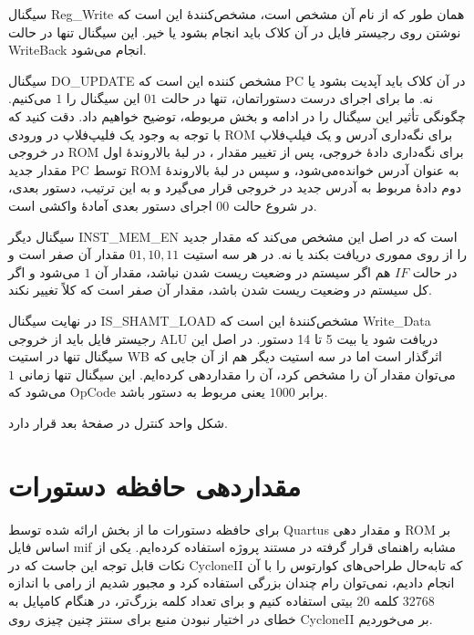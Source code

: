 \documentclass[12pt,titlepage,a4page , tikz , multi,table , svgnames,xcdraw]{article}
\begin{document}
\newpage

سیگنال Reg\_Write همان طور که از نام آن مشخص است، مشخص‌کنندهٔ این است که نوشتن روی رجیستر فایل در آن کلاک باید انجام بشود یا خیر. این سیگنال تنها در حالت WriteBack انجام می‌شود.

سیگنال DO\_UPDATE مشخص کننده این است که PC در آن کلاک باید آپدیت بشود یا نه. ما برای اجرای درست دستوراتمان، تنها در حالت $01$ این سیگنال را $1$ می‌کنیم. چگونگی تأثیر این سیگنال را در ادامه و بخش مربوطه، توضیح خواهیم داد. دقت کنید که با توجه به وجود یک فلیپ‌فلاپ در ورودی ROM برای نگه‌داری آدرس و یک فیلپ‌فلاپ در خروجی ROM برای نگه‌داری دادهٔ خروجی، پس از تغییر مقدار ، در لبهٔ بالاروندهٔ اول مقدار جدید PC توسط ROM به عنوان آدرس خوانده‌می‌شود، و سپس در لبهٔ بالاروندهٔ دوم دادهٔ مربوط به آدرس جدید در خروجی قرار می‌گیرد و به این ترتیب، دستور بعدی، در شروع حالت $00$ اجرای دستور بعدی آمادهٔ واکشی است.

سیگنال دیگر INST\_MEM\_EN است که در اصل این مشخص می‌کند که  مقدار جدید را از روی مموری دریافت بکند یا نه. در هر سه استیت $01,10,11$ مقدار آن صفر است و در حالت $IF$ هم اگر سیستم در وضعیت ریست شدن نباشد، مقدار آن $1$ می‌شود و اگر کل سیستم در وضعیت ریست شدن باشد، مقدار آن صفر است که کلاً  تغییر نکند.

در نهایت سیگنال IS\_SHAMT\_LOAD مشخص‌کنندهٔ این است که Write\_Data رجیستر فایل باید از خروجی ALU دریافت شود یا بیت 5 تا 14 دستور. در اصل این سیگنال تنها در استیت WB اثرگذار است اما در سه استیت دیگر هم از آن جایی که می‌توان مقدار آن را مشخص کرد، آن را مقداردهی کرده‌ایم. این سیگنال تنها زمانی $1$ می‌شود که OpCode برابر $1000$ یعنی مربوط به دستور  باشد.


شکل واحد کنترل در صفحهٔ بعد قرار دارد.


\begin{landscape}

\thispagestyle{empty}




\end{landscape}




\newpage

\section{مقداردهی حافظه دستورات}

برای حافظه دستورات ما از بخش  ارائه شده توسط Quartus و مقدار دهی ROM بر اساس فایل mif مشابه راهنمای قرار گرفته در مستند پروژه استفاده کرده‌ایم. یکی از نکات قابل توجه این جاست که در CycloneII که تابه‌حال طراحی‌های کوارتوس را با آن انجام دادیم، نمی‌توان رام چندان بزرگی استفاده کرد و مجبور شدیم از رامی با اندازه 32768 کلمه 20 بیتی استفاده کنیم و برای تعداد کلمه بزرگ‌تر، در هنگام کامپایل به خطای در اختیار نبودن منبع برای سنتز چنین چیزی روی CycloneII بر می‌خوردیم.
\end{document}
